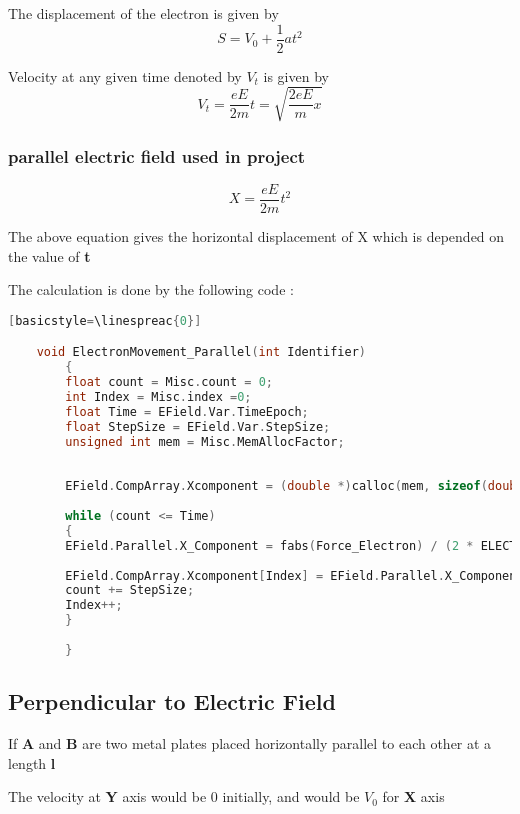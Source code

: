 \documentclass[a4paper,20pt,twoside]{report}
\begin{document}
			The displacement of the electron is given by 
			\begin{equation}
			S = V_0 + \frac{1}{2}at^2
			\end{equation}
			
			Velocity at any given time denoted by \textbf{$V_t$} is given by
			\begin{equation}
			V_t = \frac{eE}{2m}t = \sqrt{\frac{2eE}{m} x}
			\end{equation}
			
			\subsubsection{parallel electric field used in project}
			
			\begin{equation}
			X = \frac{eE}{2m}t^2
			\end{equation}
			
			The above equation gives the horizontal displacement of X which is depended
			on the value of \textbf{t}
			
			The calculation is done by the following code :
			\vspace{10mm}
			
			
\begin{lstlisting}[language = C][basicstyle=\linespreac{0}]

	void ElectronMovement_Parallel(int Identifier)
		{
		float count = Misc.count = 0;
		int Index = Misc.index =0;
		float Time = EField.Var.TimeEpoch;
		float StepSize = EField.Var.StepSize;
		unsigned int mem = Misc.MemAllocFactor;
		
		
		EField.CompArray.Xcomponent = (double *)calloc(mem, sizeof(double));
	
		while (count <= Time)
		{
		EField.Parallel.X_Component = fabs(Force_Electron) / (2 * ELECTRON_MASS) * pow(count, 2);
		
		EField.CompArray.Xcomponent[Index] = EField.Parallel.X_Component;
		count += StepSize;
		Index++;
		}
	
		}
\end{lstlisting}
	
	\subsection{Perpendicular to Electric Field}
	If \textbf{A} and \textbf{B} are two metal plates placed horizontally parallel to each other
	at a length \textbf{l}
	
	The velocity at \textbf{Y} axis would be 0 initially, and would be $V_0$ for \textbf{X} axis
	
\end{document}
